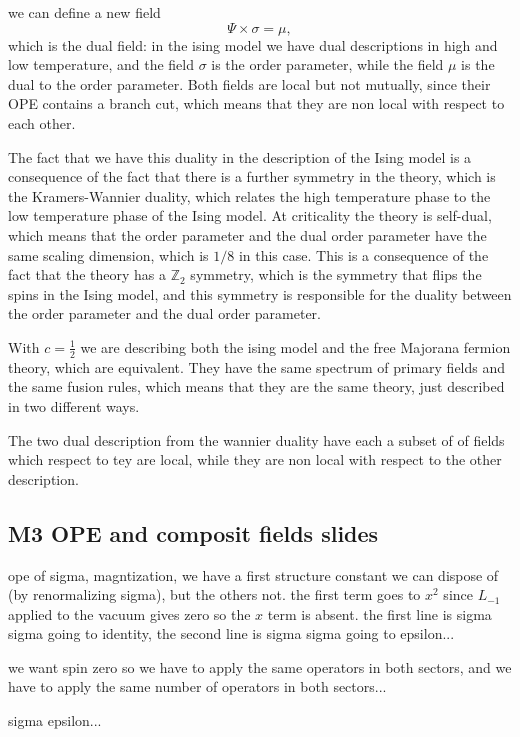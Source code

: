 we can define a new field
\[
    \Psi \times \sigma = \mu,
\]
which is the dual field: in the ising model we have dual descriptions in high and low temperature, and the field \(\sigma\) is the order parameter, while the field \(\mu\) is the dual to the order parameter. Both fields are local but not mutually, since their OPE contains a branch cut, which means that they are non local with respect to each other.

The fact that we have this duality in the description of the Ising model is a consequence of the fact that there is a further symmetry in the theory, which is the Kramers-Wannier duality, which relates the high temperature phase to the low temperature phase of the Ising model. At criticality the theory is self-dual, which means that the order parameter and the dual order parameter have the same scaling dimension, which is \(1/8\) in this case. This is a consequence of the fact that the theory has a \(\mathbb{Z}_2\) symmetry, which is the symmetry that flips the spins in the Ising model, and this symmetry is responsible for the duality between the order parameter and the dual order parameter. 

With \(c=\frac{1}{2}\) we are describing both the ising model and the free Majorana fermion theory, which are equivalent. They have the same spectrum of primary fields and the same fusion rules, which means that they are the same theory, just described in two different ways.

The two dual description from the wannier duality have each a subset of of fields which respect to tey are local, while they are non local with respect to the other description.



\subsection{M3 OPE and composit fields slides}

ope of sigma, magntization, we have a first structure constant we can dispose of (by renormalizing sigma), but the others not. the first term goes to \(x^2\) since \(L_{-1}\) applied to the vacuum gives zero so the \(x\) term is absent. the first line is sigma sigma going to identity, the second line is sigma sigma going to epsilon...

we want spin zero so we have to apply the same operators in both sectors, and we have to apply the same number of operators in both sectors...

sigma epsilon...

